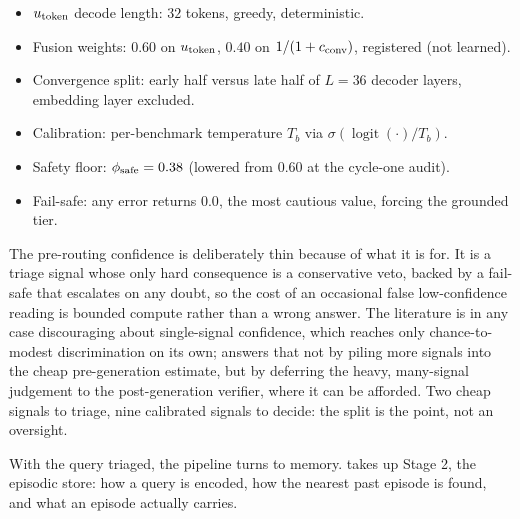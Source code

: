 \begin{bythenumbers}
\begin{itemize}[leftmargin=1.3em, itemsep=1pt]
  \item $u_{\text{token}}$ decode length: $32$ tokens, greedy, deterministic.
  \item Fusion weights: $0.60$ on $u_{\text{token}}$, $0.40$ on $1/(1+c_{\text{conv}})$, registered (not learned).
  \item Convergence split: early half versus late half of $L=36$ decoder layers, embedding layer excluded.
  \item Calibration: per-benchmark temperature $T_b$ via $\sigma(\operatorname{logit}(\cdot)/T_b)$.
  \item Safety floor: $\phi_{\text{safe}} = 0.38$ (lowered from $0.60$ at the cycle-one audit).
  \item Fail-safe: any error returns $0.0$, the most cautious value, forcing the grounded tier.
\end{itemize}
\end{bythenumbers}

\begin{defence}
The pre-routing confidence is deliberately thin because of what it is for. It is a
triage signal whose only hard consequence is a conservative veto, backed by a
fail-safe that escalates on any doubt, so the cost of an occasional false
low-confidence reading is bounded compute rather than a wrong answer. The
literature is in any case discouraging about single-signal confidence, which
reaches only chance-to-modest discrimination on its own; \caem{} answers that not
by piling more signals into the cheap pre-generation estimate, but by deferring the
heavy, many-signal judgement to the post-generation verifier, where it can be
afforded. Two cheap signals to triage, nine calibrated signals to decide: the
split is the point, not an oversight.
\end{defence}

With the query triaged, the pipeline turns to memory.  takes up
Stage 2, the episodic store: how a query is encoded, how the nearest past episode
is found, and what an episode actually carries.
